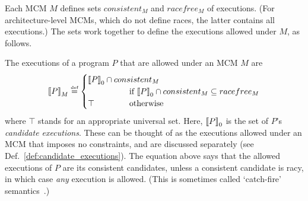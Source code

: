 Each MCM $M$ defines sets $consistent_M$ and $racefree_M$ of
executions. (For architecture-level MCMs, which do not define races,
the latter contains all executions.) The sets work together to define
the executions allowed under $M$, as follows.

\begin{definition} 
\label{def:allowed_execs}
The executions of a program $P$
that are allowed under an MCM $M$ are
%
\[
\sem{P}_M \eqdef \begin{cases} 
\mathrlap{\cand{P} \cap consistent_M}\quad\quad\quad\quad \\ & \text{if}~\cand{P}\cap
consistent_M \subseteq racefree_M \\
\top & \text{otherwise}
\end{cases}
\]
%
where $\top$ stands for an appropriate universal set. Here, ${\llbracket P \rrbracket}_0$
is the set of $P$'s \emph{candidate executions}. These can be thought
of as the executions allowed under an MCM that imposes no constraints,
and are discussed separately (see
Def.~\ref{def:candidate_executions}). The equation above says that the
allowed executions of $P$ are its consistent candidates, unless a
consistent candidate is racy, in which case \emph{any} execution is
allowed. (This is sometimes called `catch-fire'
semantics~\cite{boehm+08}.) \end{definition}

\newcommand\dashboxed[1]{\begin{tikzpicture}[baseline=(a.base)]
\node[anchor=base, draw, dashed, inner sep=1mm, rounded corners](a)
{$#1$};
\end{tikzpicture}}

